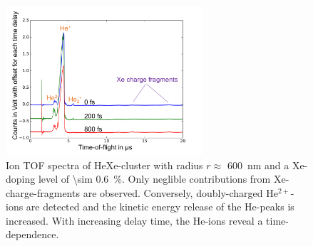 %
\begin{figure}
	\centering
		\includegraphics[width=0.65\textwidth]{images/results/TOF-helium-xenon-cluster-60-2.png}
	\caption[TOF spectra of HeXe-clusters with a \SI{\sim 0.6}{\percent} Xe-doping at various $\Delta t$.]{Ion TOF spectra of HeXe-cluster with radius $r\approx$ \SI{600}{\nano\meter} and a Xe-doping level of \SI{\sim 0.6}{\percent}. Only neglible contributions from Xe-charge-fragments are observed. Conversely, doubly-charged He$^{2+}$-ions are detected and the kinetic energy release of the He-peaks is increased. With increasing delay time, the He-ions reveal a time-dependence.}
	\label{fig:TOF-helium-xenon-cluster-60}
\end{figure}
%
